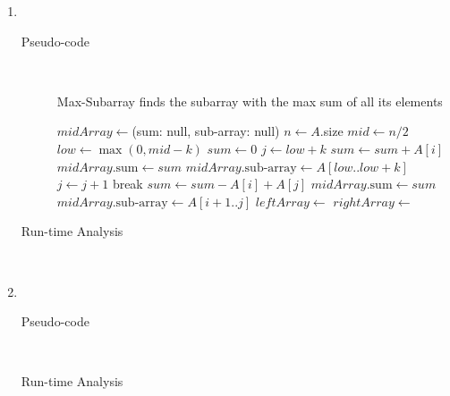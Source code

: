 \documentclass[paper=a4, fontsize=11pt]{scrartcl} %
\numberwithin{equation}{section} %
\numberwithin{figure}{section} %
\numberwithin{table}{section} %
\begin{document}
\begin{enumerate}[label=\bfseries Algorithm \arabic*:]
    \item \hfill \\
    \begin{description}
        \item[Pseudo-code] \hfill \\
        \begin{algorithmc}
            \caption{Max-Subarray finds the subarray with the max sum of all its elements}
                \State $midArray \gets $(sum: null, sub-array: null)
                \State $n \gets A$.size
                  \State {}
                \EndIf
                \State $mid \gets n / 2$
                \State $low \gets \max{(0, mid - k)}$
                \State $sum \gets 0$
                \State $j \gets low + k$
                        \State $sum \gets sum + A[i]$
                    \EndFor
                    \State $midArray. \textrm{sum} \gets sum$
                    \State $midArray. \textrm{sub-array} \gets A[low..low + k]$
                \EndIf
                    \State $j \gets j + 1$
                        \State break
                    \EndIf
                    \State $sum \gets sum - A[i] + A[j]$
                        \State $midArray. \textrm{sum} \gets sum$
                        \State $midArray. \textrm{sub-array} \gets A[i + 1..j]$
                    \EndIf
                \EndFor
                \State $leftArray \gets$ 
                \State $rightArray \gets$ 
                \State {}
            \EndFunction
        \end{algorithmc}
        \item[Run-time Analysis] \hfill \\
    \end{description}

    \item \hfill \\
    \begin{description}
        \item[Pseudo-code] \hfill \\
        \item[Run-time Analysis] \hfill \\
    \end{description}
\end{enumerate}
\end{document}
